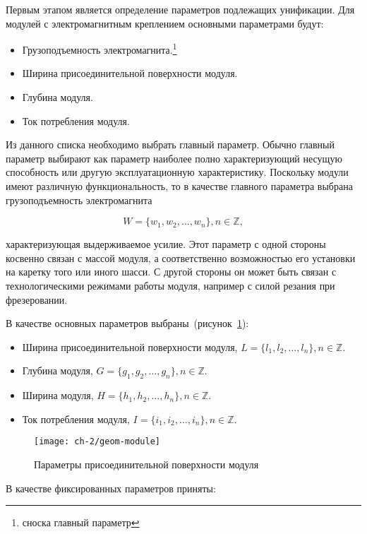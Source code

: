 Первым этапом является определение параметров подлежащих унификации. Для модулей с электромагнитным креплением основными параметрами будут:

\begin{itemize}
	\item Грузоподъемность электромагнита.\footnote{сноска главный параметр}
	\item Ширина присоединительной поверхности модуля. 
	\item Глубина модуля.
	\item Ток потребления модуля.
\end{itemize}


Из данного списка необходимо выбрать главный параметр. Обычно главный параметр выбирают как параметр наиболее полно характеризующий несущую способность или другую эксплуатационную характеристику. Поскольку модули имеют различную функциональность, то в качестве главного параметра выбрана грузоподъемность электромагнита

\[
W = \{w_1, w_2, \ldots, w_n\}, n \in \mathbb{Z},
\]

\noindent характеризующая выдерживаемое усилие. Этот параметр с одной стороны косвенно связан с массой модуля, а соответственно возможностью его установки на каретку того или иного шасси. С другой стороны он может быть связан с технологическими режимами работы модуля, например с силой резания при фрезеровании.

В качестве основных параметров выбраны~(рисунок~\cref{fig:geom-module}):

\begin{itemize}
	\item Ширина присоединительной поверхности модуля, $L = \{l_1, l_2, \ldots, l_n\}, n \in \mathbb{Z}$.
	\item Глубина модуля, $G = \{g_1, g_2, \ldots, g_n\}, n \in \mathbb{Z}$.
	\item Ширина модуля, $H = \{h_1, h_2, \ldots, h_n\}, n \in \mathbb{Z}$.
	\item Ток потребления модуля, $I = \{i_1, i_2, \ldots, i_n\}, n \in \mathbb{Z}$.
\end{itemize}

\begin{figure}[tbh]
	\centering
	\texttt{[image: ch-2/geom-module]}
	\caption{Параметры присоединительной поверхности модуля}
	\label{fig:geom-module}
\end{figure}

В качестве фиксированных параметров приняты:

